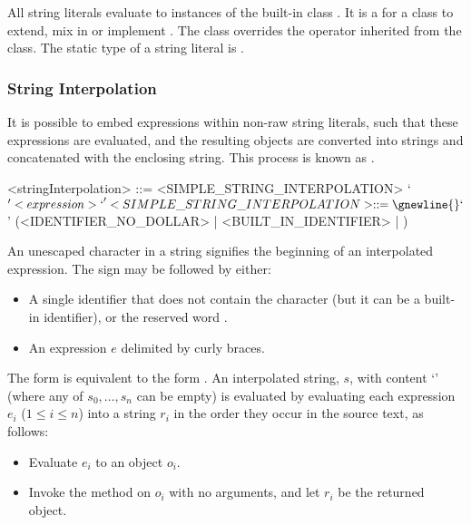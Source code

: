 \documentclass[makeidx]{article}
\begin{document}
{\LMHash{}%
All string literals evaluate to instances of the built-in class .
It is a  for a class to
extend, mix in or implement .
The  class overrides the \lit{==} operator inherited from
the  class.
The static type of a string literal is .


\subsubsection{String Interpolation}

\LMHash{}%
It is possible to embed expressions within non-raw string literals,
such that these expressions are evaluated,
and the resulting objects are converted into strings and
concatenated with the enclosing string.
This process is known as .

\begin{grammar}
<stringInterpolation> ::= <SIMPLE\_STRING\_INTERPOLATION>
  \alt `${' <expression> `}'

<SIMPLE\_STRING\_INTERPOLATION> ::= \gnewline{}
  `$' (<IDENTIFIER\_NO\_DOLLAR> | <BUILT\_IN\_IDENTIFIER> | \THIS)
\end{grammar}


\LMHash{}%
An unescaped \lit{\$} character in a string signifies
the beginning of an interpolated expression.
The \lit{\$} sign may be followed by either:
\begin{itemize}
\item A single identifier \id{} that does not contain the \lit{\$} character
  (but it can be a built-in identifier),
  or the reserved word \THIS.
\item An expression $e$ delimited by curly braces.
\end{itemize}

\LMHash{}%
The form \code{\$\id} is equivalent to the form \code{\$\{\id\}}.
An interpolated string, $s$, with content
`'
(where any of $s_0, \ldots, s_n$ can be empty)
is evaluated by evaluating each expression $e_i$ ($1 \le i \le n$)
into a string $r_i$ in the order they occur in the source text, as follows:

\begin{itemize}
\item Evaluate $e_i$ to an object $o_i$.
\item Invoke the  method on $o_i$ with no arguments,
  and let $r_i$ be the returned object.
\end{itemize}

}
\end{document}
